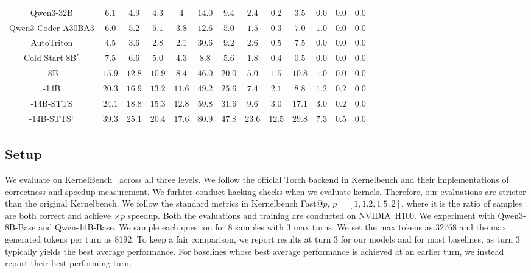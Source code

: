 \begin{table}[t!]
{\begin{tabular}{@{}c  *{4}{c} | *{4}{c} | *{4}{c} @{}}
Qwen3-32B
& $6.1$ & $4.9$ & $4.3$ & $4$
& $14.0$ & $9.4$ & $2.4$ & $0.2$
& $3.5$ & $0.0$ & $0.0$ & $0.0$ \\

Qwen3-Coder-A30BA3
& $6.0$ & $5.2$ & $5.1$ & $3.8$
& $12.6$ & $5.0$ & $1.5$ & $0.3$
& $7.0$ & $1.0$ & $0.0$ & $0.0$ \\

AutoTriton
& $4.5$ & $3.6$ & $2.8$ & $2.1$
& $30.6$ & $9.2$ & $2.6$ & $0.5$
& $7.5$ & $0.0$ & $0.0$ & $0.0$ \\

Cold-Start-8B$^*$
& $7.5$ & $6.6$ & $5.0$ & $4.3$
& $8.8$ & $5.6$ & $1.8$ & $0.4$
& $0.5$ & $0.0$ & $0.0$ & $0.0$ \\

-8B
& $15.9$ & $12.8$ & $10.9$ & $8.4$
& $46.0$ & $20.0$ & $5.0$ & $1.5$
& $\boldsymbol{10.8}$ & $1.0$ & $0.0$ & $0.0$ \\

-14B
& $\boldsymbol{20.3}$ & $\boldsymbol{16.9}$ & $\boldsymbol{13.2}$ & $\boldsymbol{11.6}$
& $\boldsymbol{49.2}$ & $\boldsymbol{25.6}$ & $\boldsymbol{7.4}$ & $\boldsymbol{2.1}$
& $8.8$ & $\boldsymbol{1.2}$ & $0.2$ & $0.0$ \\

\midrule
{}-14B-STTS
& $24.1$ & $18.8$ & $15.3$ & $12.8$
& $59.8$ & $31.6$ & $9.6$ & $3.0$
& $17.1$ & $3.0$ & $0.2$ & $0.0$ \\

-14B-STTS$^\dagger$
& $39.3$ & $25.1$ & $20.4$ & $17.6$
& $80.9$ & $47.8$ & $23.6$ & $12.5$
& $29.8$ & $7.3$ & $0.5$ & $0.0$ \\

\bottomrule
\end{tabular}%
}
\label{tab:main_table}
\end{table}

\subsection{Setup}
\label{sec:exp:setup}
We evaluate on KernelBench~\citep{ouyang2025kernelbench} across all three levels. We follow the official Torch backend in Kernelbench and their implementations of correctness and speedup measurement. We furhter conduct hacking checks when we evaluate kernels. Therefore, our evaluations are stricter than the original Kernelbench. We follow the standard metrics in Kernelbench Fast@$p$, \(p=[1,1.2,1.5,2]\), where it is the ratio of samples are both correct and achieve $\times p$ speedup. Both the evaluations and training are conducted on NVIDIA~H100. We experiment with Qwen3-8B-Base and Qwen-14B-Base. We sample each question for 8 samples with 3 max turns. We set the max tokens as 32768 and the max generated tokens per turn as 8192. To keep a fair comparison, we report results at turn 3 for our models and for most baselines, as turn 3 typically yields the best average performance. For baselines whose best average performance is achieved at an earlier turn, we instead report their best-performing turn.

